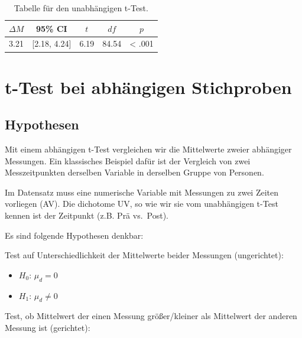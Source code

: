 \documentclass[
]{book}
\providecommand{\tightlist}{%
  \setlength{\itemsep}{0pt}\setlength{\parskip}{0pt}}
\begin{document}
\begin{table}[tbp]

\begin{center}
\begin{threeparttable}

\caption{\label{tab:unnamed-chunk-247}Tabelle für den unabhängigen t-Test.}

\begin{tabular}{lllll}
\toprule
$\Delta M$ & \multicolumn{1}{c}{95\% CI} & \multicolumn{1}{c}{$t$} & \multicolumn{1}{c}{$\mathit{df}$} & \multicolumn{1}{c}{$p$}\\
\midrule
3.21 & {}[2.18, 4.24] & 6.19 & 84.54 & < .001\\
\bottomrule
\end{tabular}

\end{threeparttable}
\end{center}

\end{table}

\section{t-Test bei abhängigen Stichproben}\label{t-test-bei-abhuxe4ngigen-stichproben}

\subsection{Hypothesen}\label{hypothesen-3}

Mit einem abhängigen t-Test vergleichen wir die Mittelwerte zweier abhängiger Messungen. Ein klassisches Beispiel dafür ist der Vergleich von zwei Messzeitpunkten derselben Variable in derselben Gruppe von Personen.

Im Datensatz muss eine numerische Variable mit Messungen zu zwei Zeiten vorliegen (AV). Die dichotome UV, so wie wir sie vom unabhängigen t-Test kennen ist der Zeitpunkt (z.B. Prä vs.~Post).

Es sind folgende Hypothesen denkbar:

Test auf Unterschiedlichkeit der Mittelwerte beider Messungen (ungerichtet):

\begin{itemize}
\tightlist
\item
  \(H_0\): \(μ_d = 0\)
\item
  \(H_1\): \(μ_d \neq 0\)
\end{itemize}

Test, ob Mittelwert der einen Messung größer/kleiner als Mittelwert der anderen Messung ist (gerichtet):
\end{document}
